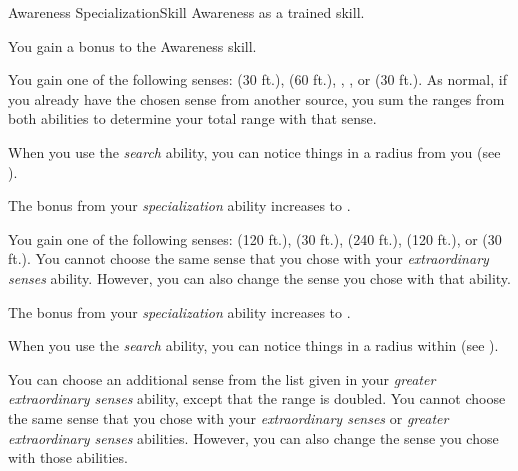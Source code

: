     \begin{feat}{Awareness Specialization}{Skill}
        \featpre Awareness as a trained skill.

         You gain a  bonus to the Awareness skill.

         You gain one of the following senses:  (30 ft.),  (60 ft.), , , or  (30 ft.).
        As normal, if you already have the chosen sense from another source, you sum the ranges from both abilities to determine your total range with that sense.

         When you use the \textit{search} ability, you can notice things in a \areamed radius from you (see ).

         The bonus from your \textit{specialization} ability increases to .

         You gain one of the following senses:  (120 ft.),  (30 ft.),  (240 ft.),  (120 ft.), or  (30 ft.).
        You cannot choose the same sense that you chose with your \textit{extraordinary senses} ability.
        However, you can also change the sense you chose with that ability.

         The bonus from your \textit{specialization} ability increases to .

         When you use the \textit{search} ability, you can notice things in a \medarea radius within \medrange (see ).

         You can choose an additional sense from the list given in your \textit{greater extraordinary senses} ability, except that the range is doubled.
        You cannot choose the same sense that you chose with your \textit{extraordinary senses} or \textit{greater extraordinary senses} abilities.
        However, you can also change the sense you chose with those abilities.
    \end{feat}

